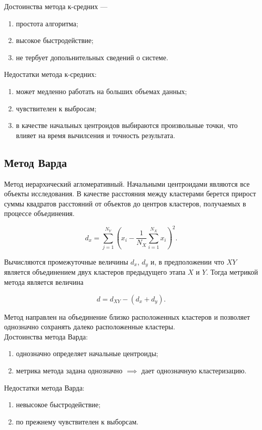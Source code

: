 \documentclass[12pt]{article}
\begin{document}
Достоинства метода к-средних ---
\begin{enumerate}
    \item простота алгоритма;
    \item высокое быстродействие;
    \item не тербует допольнительных сведений о системе.
\end{enumerate}

Недостатки метода к-средних:
\begin{enumerate}
    \item может медленно работать на больших объемах данных;
    \item чувствителен к выбросам;
    \item в качестве начальных центроидов выбираются произвольные точки, что влияет на время вычилсения и точность результата.
\end{enumerate}

\subsection{Метод Варда}
Метод иерархический агломеративный. Начальными центроидами являются все объекты исследования. В качестве расстояния между кластерами берется прирост суммы квадратов расстояний от объектов до центров кластеров, получаемых в процессе объединения.

\[ d_x = \sum_{j=1}^{N_Y} \left( x_i - \frac{1}{N_X} \sum_{i=1}^{N_X} x_i \right)^2. \]

Вычисляются промежуточные величины $d_x$, $d_y$ и, в предположении что $XY$ является объединением двух кластеров предыдущего этапа $X$ и $Y$. Тогда метрикой метода является величина

\[ d = d_{XY} - (d_x + d_y). \]

Метод направлен на объединение близко расположенных кластеров и позволяет однозначно сохранять далеко расположенные кластеры.\\

Достоинства метода Варда:
\begin{enumerate}
    \item однозначно определяет начальные центроиды;
    \item метрика метода задана однозначно $\implies$ дает однозначную кластеризацию.
\end{enumerate}

Недостатки метода Варда:
\begin{enumerate}
    \item невысокое быстродействие;
    \item по прежнему чувствителен к выборсам.
\end{enumerate}
\end{document}
